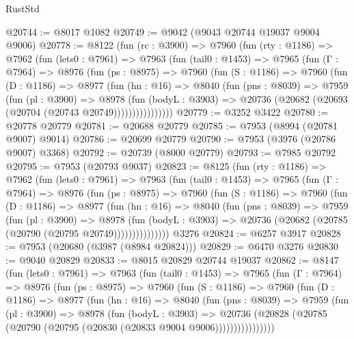 \begin{lexlean}{RustStd}
\begin{coremodule}
@20744 := @8017 @1082
@20749 := @9042 (@9043 @20744 @19037 @9004 @9006)
@20778 := @8122
    (fun (rc : @3900) =>
    @7960
      (fun (rty : @1186) =>
      @7962
        (fun (lets0 : @7961) =>
        @7963
          (fun (tail0 : @1453) =>
          @7965
            (fun (Γ : @7964) =>
            @8976
              (fun (ps : @8975) =>
              @7960
                (fun (S : @1186) =>
                @7960
                  (fun (D : @1186) =>
                  @8977
                    (fun (hn : @16) =>
                    @8040
                      (fun (pns : @8039) =>
                      @7959
                        (fun (pl : @3900) =>
                        @8978
                          (fun (bodyL : @3903) =>
                          @20736 (@20682 (@20693 (@20704 (@20743 @20749))))))))))))))))
@20779 := @3252 @3422
@20780 := @20778 @20779
@20781 := @20688 @20779
@20785 := @7953 (@8994 (@20781 @9007) @9014)
@20786 := @20699 @20779
@20790 := @7953 (@3976 (@20786 @9007) @3368)
@20792 := @20739 (@8000 @20779)
@20793 := @7985 @20792
@20795 := @7953 (@20793 @9037)
@20823 := @8125
    (fun (rty : @1186) =>
    @7962
      (fun (lets0 : @7961) =>
      @7963
        (fun (tail0 : @1453) =>
        @7965
          (fun (Γ : @7964) =>
          @8976
            (fun (ps : @8975) =>
            @7960
              (fun (S : @1186) =>
              @7960
                (fun (D : @1186) =>
                @8977
                  (fun (hn : @16) =>
                  @8040
                    (fun (pns : @8039) =>
                    @7959
                      (fun (pl : @3900) =>
                      @8978
                        (fun (bodyL : @3903) =>
                        @20736 (@20682 (@20785 (@20790 (@20795 @20749)))))))))))))))
    @3276
@20824 := @6257 @3917
@20828 := @7953 (@20680 (@3987 (@8984 @20824)))
@20829 := @6470 @3276
@20830 := @9040 @20829
@20833 := @8015 @20829 @20744 @19037
@20862 := @8147
    (fun (lets0 : @7961) =>
    @7963
      (fun (tail0 : @1453) =>
      @7965
        (fun (Γ : @7964) =>
        @8976
          (fun (ps : @8975) =>
          @7960
            (fun (S : @1186) =>
            @7960
              (fun (D : @1186) =>
              @8977
                (fun (hn : @16) =>
                @8040
                  (fun (pns : @8039) =>
                  @7959
                    (fun (pl : @3900) =>
                    @8978
                      (fun (bodyL : @3903) =>
                      @20736
                        (@20828 (@20785 (@20790 (@20795 (@20830 (@20833 @9004 @9006))))))))))))))))

\end{coremodule}
\end{lexlean}
